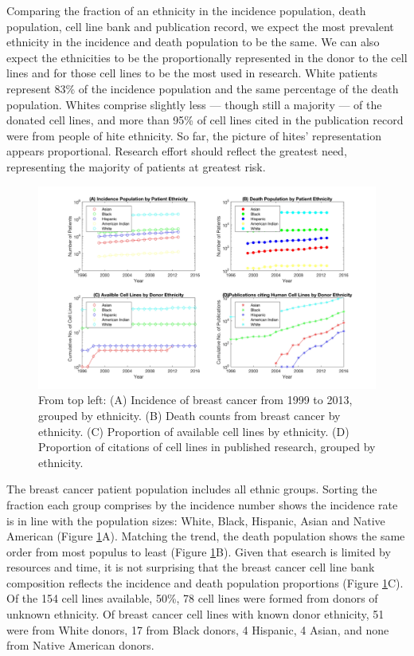 \documentclass[11pt]{article}
\begin{document}
Comparing the fraction of an ethnicity in the incidence population, death population, cell line bank and publication record, we expect the most prevalent ethnicity in the incidence and death population to be the same. We can also expect the ethnicities to be the proportionally represented in the donor to the cell lines and for those cell lines to be the most used in research. White patients represent 83\% of the incidence population and the same percentage of the death population. Whites comprise slightly less --- though still a majority --- of the donated cell lines, and more than 95\% of cell lines cited in the publication record were from people of hite ethnicity. So far, the picture of hites' representation appears proportional. Research effort should reflect the greatest need, representing the majority of patients at greatest risk.%

\begin{figure}[h!]
\centering
\includegraphics[width=1\columnwidth, trim = {10cm 0cm 10cm 0cm}, clip]{Figures/Timeline2x2.jpg}
\caption{\label{PS2} From top left: (A) Incidence of breast cancer from 1999 to 2013, grouped by ethnicity. (B) Death counts from breast cancer by ethnicity. (C) Proportion of available cell lines by ethnicity. (D) Proportion of citations of cell lines in published research, grouped by ethnicity.}%
\end{figure}

The breast cancer patient population includes all ethnic groups. Sorting the fraction each group comprises by the incidence number shows the incidence rate is in line with the population sizes: White, Black, Hispanic, Asian and Native American (Figure \ref{PS2}A). Matching the trend, the death population shows the same order from most populus to least (Figure \ref{PS2}B). Given that esearch is limited by resources and time, it is not surprising that the breast cancer cell line bank composition reflects the incidence and death population proportions (Figure \ref{PS2}C). Of the 154 cell lines available, 50\%, 78 cell lines were formed from donors of unknown ethnicity. Of breast cancer cell lines with known donor ethnicity, 51 were from White donors, 17 from Black donors, 4 Hispanic, 4 Asian, and none from Native American donors.
\end{document}
